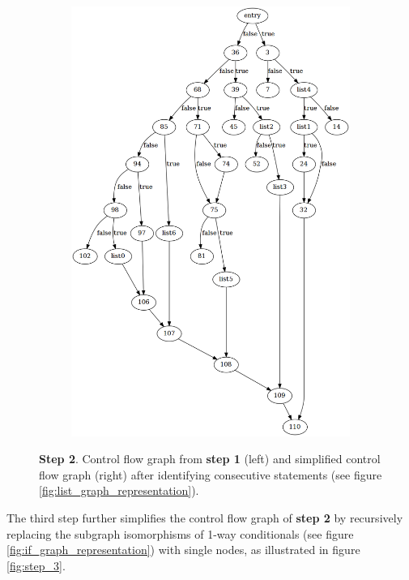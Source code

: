 \begin{figure}[htbp]
\begin{subfigure}[t]{0.45\textwidth}
	\end{subfigure}
	\qquad
	\begin{subfigure}[t]{0.45\textwidth}
		\includegraphics[width=\textwidth]{appendices/stmt_example/stmt_2.png}
	\end{subfigure}
	\caption{\textbf{Step 2}. Control flow graph from \textbf{step 1} (left) and simplified control flow graph (right) after identifying consecutive statements (see figure \ref{fig:list_graph_representation}).}
	\label{fig:step_2}
\end{figure}

The third step further simplifies the control flow graph of \textbf{step 2} by recursively replacing the subgraph isomorphisms of 1-way conditionals (see figure \ref{fig:if_graph_representation}) with single nodes, as illustrated in figure \ref{fig:step_3}.

